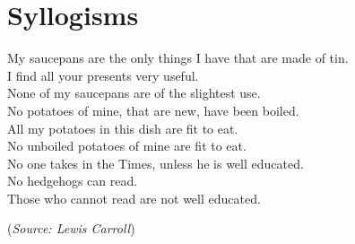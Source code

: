 \chapter{Syllogisms}

My saucepans are the only things I have that are made of tin. \\
I find all your presents very useful. \\
None of my saucepans are of the slightest use. \\

No potatoes of mine, that are new, have been boiled. \\
All my potatoes in this dish are fit to eat. \\
No unboiled potatoes of mine are fit to eat. \\

No one takes in the Times, unless he is well educated. \\
No hedgehogs can read. \\
Those who cannot read are not well educated.

(\textit{Source: Lewis Carroll})